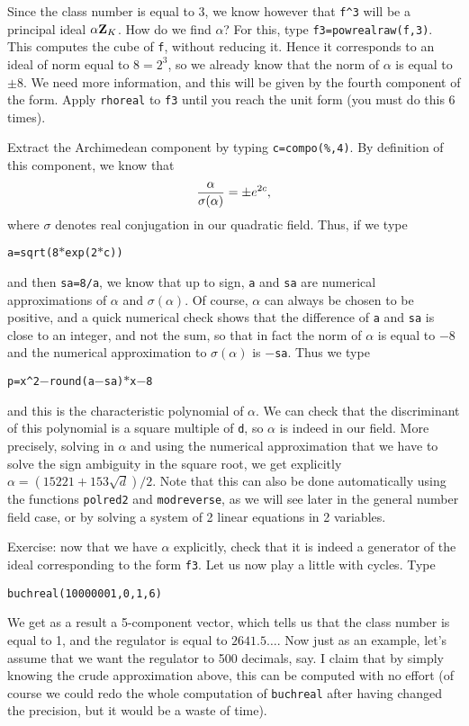 Since the class number is equal to 3, we know however that {\tt f\^{}3} will be
a principal ideal $\alpha{\bf Z}_K$. How do we find $\alpha$? For this, type
{\tt f3=powrealraw(f,3)}. This computes the cube of {\tt f}, without reducing
it. Hence it corresponds to an ideal of norm equal to $8=2^3$, so we already
know that the norm of $\alpha$ is equal to $\pm8$. We need more information,
and this will be given by the fourth component of the form. Apply {\tt rhoreal}
to {\tt f3} until you reach the unit form (you must do this 6 times).

Extract the Archimedean component by typing {\tt c=compo(\%,4)}. By
definition of this component, we know that 
$${\alpha\over{\sigma(\alpha)}}=\pm e^{2c},$$
where $\sigma$ denotes real conjugation in our quadratic field. Thus, if we type 

\centerline{\tt a=sqrt(8$*$exp(2$*$c))}

and then {\tt sa=8/a}, we know that up to sign, {\tt a} and {\tt sa} are
numerical approximations of $\alpha$ and $\sigma(\alpha)$. Of course, $\alpha$
can always be chosen to be positive, and a quick numerical check shows that
the difference of {\tt a} and {\tt sa} is close to an integer, and not the sum,
so that in fact the norm of $\alpha$ is equal to $-8$ and the numerical 
approximation to $\sigma(\alpha)$ is {\tt $-$sa}. Thus we type

\centerline{\tt p=x\^{}2$-$round(a$-$sa)$*$x$-$8}

and this is the characteristic polynomial of $\alpha$. We can check that
the discriminant of this polynomial is a square multiple of {\tt d}, so
$\alpha$ is indeed in our field. More precisely, solving in $\alpha$
and using the numerical approximation that we have to solve the sign 
ambiguity in the square root, we get explicitly $\alpha=(15221+153\sqrt d)/2$.
Note that this can also be done automatically using the functions {\tt polred2}
and {\tt modreverse}, as we will see later in the general number field case,
or by solving a system of 2 linear equations in 2 variables.

Exercise: now that we have $\alpha$ explicitly, check that it is indeed a 
generator of the ideal corresponding to the form {\tt f3}.
\medskip
Let us now play a little with cycles. Type

\centerline{\tt buchreal(10000001,0,1,6)}

We get as a result a 5-component vector, which tells us that the class number
is equal to 1, and the regulator is equal to $2641.5\dots$.
Now just as an example, let's assume that we want the regulator to 500
decimals, say. I claim that by simply knowing the crude approximation above,
this can be computed with no effort (of course we could redo the whole 
computation of {\tt buchreal} after having changed the precision, but it
would be a waste of time).

